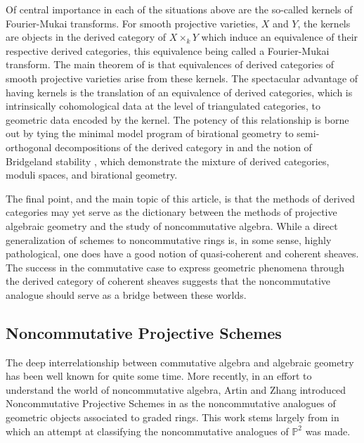 \documentclass[11pt]{amsart}
\begin{document}
Of central importance in each of the situations above are the so-called kernels of Fourier-Mukai transforms.
For smooth projective varieties, $X$ and $Y$, the kernels are objects in the derived category of $X \times_k Y$ which induce an equivalence of their respective derived categories, this equivalence being called a Fourier-Mukai transform.
The main theorem of \cite{Orlov1997} is that equivalences of derived categories of smooth projective varieties arise from these kernels.
The spectacular advantage of having kernels is the translation of an equivalence of derived categories, which is intrinsically cohomological data at the level of triangulated categories, to geometric data encoded by the kernel.
The potency of this relationship is borne out by tying the minimal model program of birational geometry to semi-orthogonal decompositions of the derived category in \cite{Bridgeland02,kawamata2002} and the notion of Bridgeland stability \cite{Bri07, ABCH13, BM14a, BM14b}, which demonstrate the mixture of derived categories, moduli spaces, and birational geometry.

The final point, and the main topic of this article, is that the methods of derived categories may yet serve as the dictionary between the methods of projective algebraic geometry and the study of noncommutative algebra.
While a direct generalization of schemes to noncommutative rings is, in some sense, highly pathological, one does have a good notion of quasi-coherent and coherent sheaves.
The success in the commutative case to express geometric phenomena through the derived category of coherent sheaves suggests that the noncommutative analogue should serve as a bridge between these worlds.

\subsection*{Noncommutative Projective Schemes}
The deep interrelationship between commutative algebra and algebraic geometry has been well known for quite some time.
More recently, in an effort to understand the world of noncommutative algebra, Artin and Zhang introduced Noncommutative Projective Schemes in \cite{AZ94} as the noncommutative analogues of geometric objects associated to graded rings.
This work stems largely from \cite{AS87} in which an attempt at classifying the noncommutative analogues of $\mathbb{P}^2$ was made.
\end{document}
